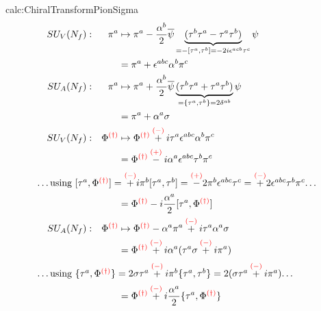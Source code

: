 \begin{calc}{calc:ChiralTransformPionSigma}
\begin{subequations}
\begin{align}
    &&SU_V(N_f):&&\pi^a&\mapsto\pi^a-\frac{\alpha^b}{2}\overline{\psi}\underbrace{(\tau^b\tau^a-\tau^a\tau^b)}_{=-[\tau^a,\tau^b]=-2{i}\epsilon^{acb}\tau^c}\psi&&&&\\
    &&&&&=\pi^a+\epsilon^{abc}\alpha^b\pi^c&&&&\\
    &&SU_A(N_f):&&\pi^a&\mapsto\pi^a+\frac{\alpha^b}{2}\overline{\psi}\underbrace{(\tau^b\tau^a+\tau^a\tau^b)}_{=\{\tau^a,\tau^b\}=2\delta^{ab}}\psi&&&&\\
    &&&&&=\pi^a+\alpha^a\sigma&&&&\\
    &&SU_V(N_f):&&\Phi^{\textcolor{red}{(\dagger)}}&\mapsto\Phi^{\textcolor{red}{(\dagger)}}\overset{\textcolor{red}{(-)}}{+}{i}\tau^a\epsilon^{abc}\alpha^b\pi^c&&&&\\
    &&&&&=\Phi^{\textcolor{red}{(\dagger)}}\overset{\textcolor{red}{(+)}}{-}{i}\alpha^a\epsilon^{abc}\tau^b\pi^c&&&&\\
    \intertext{\dots using $[\tau^a,\Phi^{\textcolor{red}{(\dagger)}}]=\overset{\textcolor{red}{(-)}}{+}{i}\pi^b[\tau^a,\tau^b]=\overset{\textcolor{red}{(+)}}{-}2\pi^b\epsilon^{abc}\tau^c=\overset{\textcolor{red}{(-)}}{+}2\epsilon^{abc}\tau^b\pi^c$\dots}
    &&&&&=\Phi^{\textcolor{red}{(\dagger)}}-{i}\frac{\alpha^a}{2}[\tau^a,\Phi^{\textcolor{red}{(\dagger)}}]&&&&\\
    &&SU_A(N_f):&&\Phi^{\textcolor{red}{(\dagger)}}&\mapsto\Phi^{\textcolor{red}{(\dagger)}}-\alpha^a\pi^a\overset{\textcolor{red}{(-)}}{+}{i}\tau^a\alpha^a\sigma&&&&\\
    &&&&&=\Phi^{\textcolor{red}{(\dagger)}}\overset{\textcolor{red}{(-)}}{+}{i}\alpha^a(\tau^a\sigma\overset{\textcolor{red}{(-)}}{+}{i}\pi^a)&&&&\\
    \intertext{\dots using $\{\tau^a,\Phi^{\textcolor{red}{(\dagger)}}\}=2\sigma\tau^a\overset{\textcolor{red}{(-)}}{+}{i}\pi^b\{\tau^a,\tau^b\}=2(\sigma\tau^a\overset{\textcolor{red}{(-)}}{+}{i}\pi^a)$\dots}
    &&&&&=\Phi^{\textcolor{red}{(\dagger)}}\overset{\textcolor{red}{(-)}}{+}{i}\frac{\alpha^a}{2}\{\tau^a,\Phi^{\textcolor{red}{(\dagger)}}\}&&&&
\end{align}
\end{subequations}
\end{calc}

